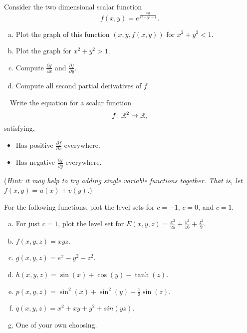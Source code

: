 \documentclass[12pt]{article} %
\newcommand{\grad}{\boldsymbol{\vec{\nabla}}}
\begin{document}
\begin{problem} Consider the two dimensional scalar function 
\[
f(x,y)=e^{\frac{xy}{x^2+y^2-1}}.
\]  
    \begin{enumerate}[(a)]
        \item Plot the graph of this function $(x,y,f(x,y))$ for $x^2+y^2<1$.  
        \item Plot the graph for $x^2+y^2>1$.  
        \item Compute $\frac{\partial f}{\partial x}$ and $\frac{\partial f}{\partial y}$.
        \item Compute all second partial derivatives of $f$.
    \end{enumerate}
\end{problem}

\begin{problem}~
Write the equation for a scalar function 
    \[
    f\colon \mathbb{R}^2 \to \mathbb{R},
    \]
    satisfying,
    \begin{itemize}
        \item Has positive $\frac{\partial f}{\partial x}$ everywhere.  
        \item Has negative $\frac{\partial f}{\partial y}$ everywhere.  
    \end{itemize}
    (\emph{Hint: it may help to try adding single variable functions together. That is, let $f(x,y)=u(x)+v(y)$.})
\end{problem}


\begin{problem}
For the following functions, plot the level sets for $c=-1$, $c=0$, and $c=1$. 
\begin{multicols}{2}
\begin{enumerate}[(a)]
    \item For just $c=1$, plot the level set for $E(x,y,z) = \frac{x^2}{25} + \frac{y^2}{16} + \frac{z^2}{9}$.
    \item $f(x,y,z) = xyz$.
    \item $g(x,y,z) = e^x-y^2-z^2$.
    \item $h(x,y,z) = \sin(x)+\cos(y)-\tanh(z)$.
    \item $p(x,y,z) = \sin^2(x)+\sin^2(y)-\frac{1}{2}\sin(z)$.
    \item $q(x,y,z) = x^2+xy+y^2+sin(yz)$.
    \item One of your own choosing.
\end{enumerate}
\end{multicols}
\end{problem}
\end{document}

